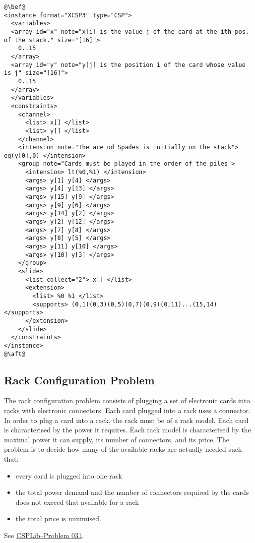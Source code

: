 \documentclass[10pt]{article}
\begin{document}
\begin{lstlisting}
@\bef@
<instance format="XCSP3" type="CSP">
  <variables>
  <array id="x" note="x[i] is the value j of the card at the ith pos. of the stack." size="[16]">
    0..15
  </array>
  <array id="y" note="y[j] is the position i of the card whose value is j" size="[16]">
    0..15
  </array>
  </variables>
  <constraints>
    <channel>
      <list> x[] </list>
      <list> y[] </list>
    </channel>
    <intension note="The ace od Spades is initially on the stack"> eq(y[0],0) </intension>
    <group note="Cards must be played in the order of the piles">
      <intension> lt(%0,%1) </intension>
      <args> y[1] y[4] </args>
      <args> y[4] y[13] </args>
      <args> y[15] y[9] </args>
      <args> y[9] y[6] </args>
      <args> y[14] y[2] </args>
      <args> y[2] y[12] </args>
      <args> y[7] y[8] </args>
      <args> y[8] y[5] </args>
      <args> y[11] y[10] </args>
      <args> y[10] y[3] </args>
    </group>
    <slide>
      <list collect="2"> x[] </list>
      <extension>
        <list> %0 %1 </list>
        <supports> (0,1)(0,3)(0,5)(0,7)(0,9)(0,11)...(15,14) </supports>
      </extension>
    </slide>
  </constraints>
</instance>
@\aft@
\end{lstlisting}  


\subsection{Rack Configuration Problem}


The rack configuration problem consists of plugging a set of electronic cards into racks with electronic connectors.
Each card plugged into a rack uses a connector.
In order to plug a card into a rack, the rack must be of a rack model.
Each card is characterised by the power it requires.
Each rack model is characterised by the maximal power it can supply, its number of connectors, and its price.
The problem is to decide how many of the available racks are actually needed such that: %
\begin{itemize}
\item every card is plugged into one rack
\item the total power demand and the number of connectors required by the cards does not exceed that available for a rack
\item the total price is minimised.
\end{itemize}
See \href{http://csplib.org/Problems/prob031/}{CSPLib--Problem 031}.
\end{document}

